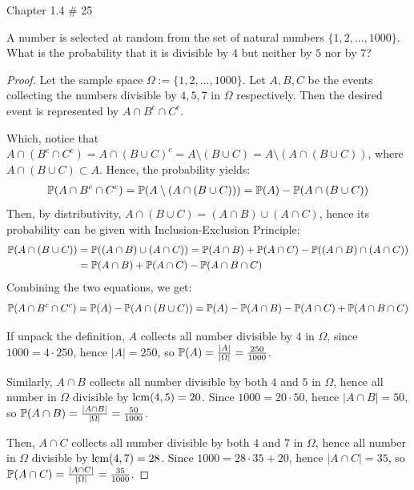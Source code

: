 \documentclass{article}
\begin{document}
\newpage

\begin{ques}\label{q7}
    Chapter 1.4 \# 25

    A number is selected at random from the set of natural numbers $\{1,2,...,1000\}$. What is the probability that it is divisible by $4$ but neither by $5$ nor by $7$?
\end{ques}

\begin{proof}
    Let the sample space $\Omega:=\{1,2,...,1000\}$. Let $A,B,C$ be the events collecting the numbers divisible by $4,5,7$ in $\Omega$ respectively. Then the desired event is represented by $A\cap B^c\cap C^c$.

    Which, notice that $A\cap (B^c\cap C^c) = A\cap (B\cup C)^c = A\setminus (B\cup C) = A\setminus (A\cap (B\cup C))$, where $A\cap (B\cup C)\subset A$. Hence, the probability yields:
    \begin{align}
        \mathbb{P}(A\cap B^c\cap C^c)=\mathbb{P}(A\setminus(A\cap (B\cup C)))=\mathbb{P}(A)-\mathbb{P}(A\cap (B\cup C))
    \end{align}
    Then, by distributivity, $A\cap (B\cup C)=(A\cap B)\cup (A\cap C)$, hence its probability can be given with Inclusion-Exclusion Principle:
    \begin{align}
        \mathbb{P}(A\cap (B\cup C))&=\mathbb{P}((A\cap B)\cup(A\cap C)) = \mathbb{P}(A\cap B)+\mathbb{P}(A\cap C)-\mathbb{P}((A\cap B)\cap (A\cap C))\\
        &= \mathbb{P}(A\cap B)+\mathbb{P}(A\cap C)-\mathbb{P}(A\cap B\cap C)
    \end{align}
    Combining the two equations, we get:
    \begin{align}
        \mathbb{P}(A\cap B^c\cap C^c) = \mathbb{P}(A) - \mathbb{P}(A\cap (B\cup C)) = \mathbb{P}(A) - \mathbb{P}(A\cap B)-\mathbb{P}(A\cap C)+\mathbb{P}(A\cap B\cap C)
    \end{align}

    If unpack the definition, $A$ collects all number divisible by $4$ in $\Omega$, since $1000 = 4 \cdot 250$, hence $|A|=250$, so $\mathbb{P}(A) = \frac{|A|}{|\Omega|}=\frac{250}{1000}$.

    Similarly, $A\cap B$ collects all number divisible by both $4$ and $5$ in $\Omega$, hence all number in $\Omega$ divisible by $\mathrm{lcm}(4,5)=20$. Since $1000 = 20\cdot 50$, hence $|A\cap B|=50$, so $\mathbb{P}(A\cap B)=\frac{|A\cap B|}{|\Omega|}=\frac{50}{1000}$.

    Then, $A\cap C$ collects all number divisible by both $4$ and $7$ in $\Omega$, hence all number in $\Omega$ divisible by $\mathrm{lcm}(4,7)=28$. Since $1000 = 28 \cdot 35 + 20$, hence $|A\cap C|=35$, so $\mathbb{P}(A\cap C)=\frac{|A\cap C|}{|\Omega|}=\frac{35}{1000}$.


\end{proof}
\end{document}
